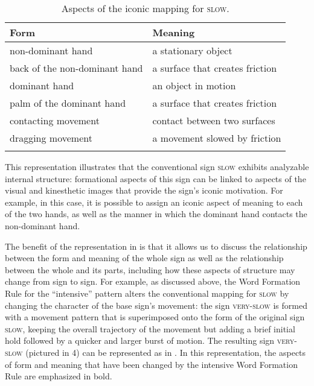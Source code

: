 \documentclass[output=paper,
modfonts
]{LSP/langsci}
\begin{document}
\begin{table}
\begin{tabular}{ll}
\lsptoprule
Form & Meaning\\
\midrule
non-dominant hand & a stationary object\\

back of the non-dominant hand & a surface that creates friction\\

dominant hand & an object in motion\\

palm of the dominant hand & a surface that creates friction\\

contacting movement & contact between two surfaces\\

dragging movement & a movement slowed by friction\\
\lspbottomrule
\end{tabular}
\caption{Aspects of the iconic mapping for \textsc{slow}.}
\label{tab:1}
\end{table}

  This representation illustrates that the conventional sign \textsc{slow} exhibits analyzable internal structure: formational aspects of this sign can be linked to aspects of the visual and kinesthetic images that provide the sign's iconic motivation. For example, in this case, it is possible to assign an iconic aspect of meaning to each of the two hands, as well as the manner in which the dominant hand contacts the non-dominant hand.

  The benefit of the representation in  is that it allows us to discuss the relationship between the form and meaning of the whole sign as well as the relationship between the whole and its parts, including how these aspects of structure may change from sign to sign. For example, as discussed above, the Word Formation Rule for the ``intensive'' pattern alters the conventional mapping for \textsc{slow} by changing the character of the base sign's movement: the sign \textsc{very-slow} is formed with a movement pattern that is superimposed onto the form of the original sign \textsc{slow}, keeping the overall trajectory of the movement but adding a brief initial hold followed by a quicker and larger burst of motion. The resulting sign \textsc{very-slow} (pictured in 4) can be represented as in . In this representation, the aspects of form and meaning that have been changed by the intensive Word Formation Rule are emphasized in bold.
\end{document}
